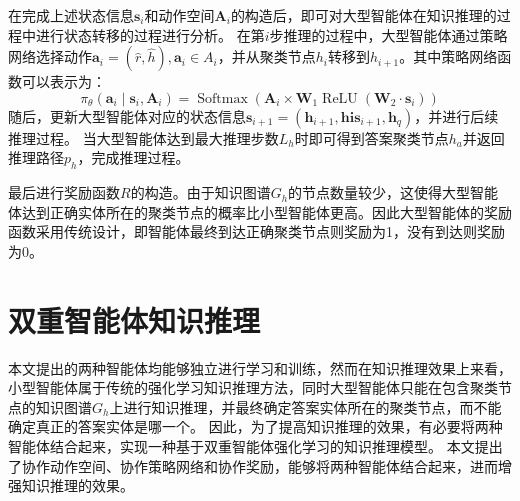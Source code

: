 \documentclass[algorithmlist, AutoFakeBold, AutoFakeSlant, figurelist, tablelist, nomlist, engineering, openany]{seuthesix} %
\begin{document}
在完成上述状态信息$\bm{s}_i$和动作空间$\bm{A}_i$的构造后，即可对大型智能体在知识推理的过程中进行状态转移的过程进行分析。
在第$i$步推理的过程中，大型智能体通过策略网络选择动作$\bm{a}_i = (\hat{r}, \hat{h}), \bm{a}_i \in A_i$，并从聚类节点$h_i$转移到$h_{i+1}$。其中策略网络函数可以表示为：
\begin{equation}
  \pi_\theta\left(\bm{a}_i \mid \bm{s}_i, \bm{A}_i\right) =\operatorname{Softmax}\left(\bm{A}_i \times \mathbf{W}_1 \operatorname{ReLU}\left(\mathbf{W}_2 \cdot \bm{s}_i\right)\right)
\end{equation}
随后，更新大型智能体对应的状态信息$\bm{s}_{i+1} = (\bm{h}_{i+1}, \bm{his}_{i+1}, \bm{h}_q)$，并进行后续推理过程。
当大型智能体达到最大推理步数$L_h$时即可得到答案聚类节点$h_a$并返回推理路径$p_h$，完成推理过程。

最后进行奖励函数$R$的构造。由于知识图谱$G_h$的节点数量较少，这使得大型智能体达到正确实体所在的聚类节点的概率比小型智能体更高。因此大型智能体的奖励函数采用传统设计，即智能体最终到达正确聚类节点则奖励为1，没有到达则奖励为0。

\section{双重智能体知识推理}
本文提出的两种智能体均能够独立进行学习和训练，然而在知识推理效果上来看，小型智能体属于传统的强化学习知识推理方法，同时大型智能体只能在包含聚类节点的知识图谱$G_h$上进行知识推理，并最终确定答案实体所在的聚类节点，而不能确定真正的答案实体是哪一个。
因此，为了提高知识推理的效果，有必要将两种智能体结合起来，实现一种基于双重智能体强化学习的知识推理模型。
本文提出了协作动作空间、协作策略网络和协作奖励，能够将两种智能体结合起来，进而增强知识推理的效果。
\end{document}
